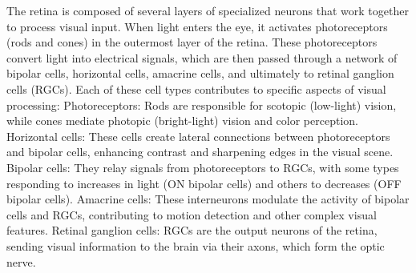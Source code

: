The retina is composed of several layers of specialized neurons that work together to process visual input. When light enters the eye, it activates photoreceptors (rods and cones) in the outermost layer of the retina. These photoreceptors convert light into electrical signals, which are then passed through a network of bipolar cells, horizontal cells, amacrine cells, and ultimately to retinal ganglion cells (RGCs). Each of these cell types contributes to specific aspects of visual processing: Photoreceptors: Rods are responsible for scotopic (low-light) vision, while cones mediate photopic (bright-light) vision and color perception. Horizontal cells: These cells create lateral connections between photoreceptors and bipolar cells, enhancing contrast and sharpening edges in the visual scene. Bipolar cells: They relay signals from photoreceptors to RGCs, with some types responding to increases in light (ON bipolar cells) and others to decreases (OFF bipolar cells). Amacrine cells: These interneurons modulate the activity of bipolar cells and RGCs, contributing to motion detection and other complex visual features.
Retinal ganglion cells: RGCs are the output neurons of the retina, sending visual information to the brain via their axons, which form the optic nerve.
